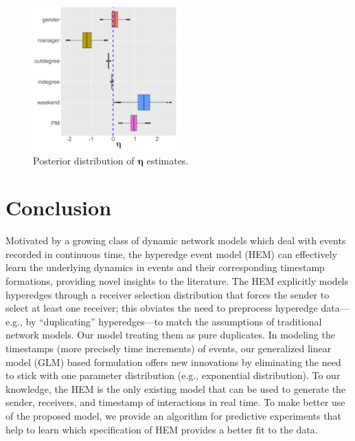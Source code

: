 \documentclass[ba]{imsart}
\numberwithin{equation}{section}
\theoremstyle{plain}
\begin{document}
			\begin{figure}[!t]
				\centering
				\includegraphics[width=0.4975\textwidth]{img/etaplotnew-1.png}	
				\caption {Posterior distribution of $\boldsymbol{\eta}$ estimates.}
				\label{figure:etaresults}
			\end{figure}	
	\section{Conclusion}\label{sec:conclusion}
	Motivated by a growing class of dynamic network models which deal with events recorded in continuous time, the hyperedge event model (HEM) can effectively learn the underlying dynamics in events and their corresponding timestamp formations, providing novel insights to the literature. The HEM explicitly models hyperedges through a receiver selection distribution that forces the sender to select at least one receiver; this obviates the need to preprocess hyperedge data---e.g., by ``duplicating'' hyperedges---to match the assumptions of traditional network models. Our model treating them as pure duplicates. In modeling the timestamps (more precisely time increments) of events, our generalized linear model (GLM) based formulation offers new innovations by eliminating the need to stick with one parameter distribution (e.g., exponential distribution). To our knowledge, the HEM is the only existing model that can be used to generate the sender, receivers, and timestamp of interactions in real time. To make better use of the proposed model, we provide an algorithm for predictive experiments that help to learn which specification of HEM provides a better fit to the data. 
	
\end{document}
